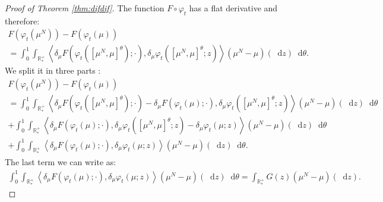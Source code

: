 \documentclass[11pt,a4paper]{article}
\newcommand{\RRP}{\mathbb{R}^+_*}
\newcommand{\brac}[1]{\left\langle#1\right\rangle}
\newcommand{\dd}{\mathop{}\!\mathrm{d}}
\begin{document}
\begin{proof}[Proof of Theorem \ref{thm:difdif}]
    The function $F\circ \varphi_t$ has a flat derivative and therefore:
    \begin{multline*}
        F\left(\varphi_t(\mu^N)\right) - F\left(\varphi_t(\mu)\right) \\
        = \int_0^1 \int_{\RRP} \brac{\delta_\mu F\left(\varphi_t \left(\left[\mu^N,\mu \right]^\theta\right);\cdot \right), \delta_\mu \varphi_t\left(\left[\mu^N,\mu \right]^\theta;z \right)} \left(\mu^N - \mu\right)(\dd z)\dd \theta.
    \end{multline*}
    We split it in three parts :
    \begin{multline*}
        F\left(\varphi_t(\mu^N)\right) - F\left(\varphi_t(\mu)\right) \\
        = \int_0^1 \int_{\RRP} \brac{\delta_\mu F\left(\varphi_t \left(\left[\mu^N,\mu \right]^\theta\right);\cdot \right)- \delta_\mu F\left(\varphi_t \left(\mu\right);\cdot \right), \delta_\mu \varphi_t\left(\left[\mu^N,\mu \right]^\theta;z \right)} \left(\mu^N - \mu\right)(\dd z)\dd \theta \\
        + \int_0^1 \int_{\RRP} \brac{\delta_\mu F\left(\varphi_t \left(\mu\right);\cdot \right), \delta_\mu \varphi_t\left(\left[\mu^N,\mu \right]^\theta;z \right) -  \delta_\mu \varphi_t\left(\mu;z \right)} \left(\mu^N - \mu\right)(\dd z)\dd \theta \\
        + \int_0^1 \int_{\RRP} \brac{\delta_\mu F\left(\varphi_t \left(\mu\right);\cdot \right), \delta_\mu \varphi_t\left(\mu;z \right)} \left(\mu^N - \mu\right)(\dd z)\dd \theta.
    \end{multline*}
    The last term we can write as:
    \begin{align*}
        \int_0^1 \int_{\RRP} \brac{\delta_\mu F\left(\varphi_t \left(\mu\right);\cdot \right), \delta_\mu \varphi_t\left(\mu;z \right)} \left(\mu^N - \mu\right)(\dd z)\dd \theta
        = \int_{\RRP}G(z) \left( \mu^N - \mu\right)(\dd z)  .
    \end{align*}


\end{proof}
\end{document}
